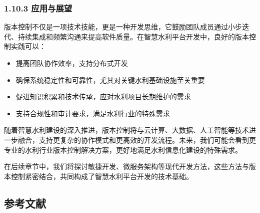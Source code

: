 \subsubsection{1.10.3 应用与展望}\label{ux5e94ux7528ux4e0eux5c55ux671b}

版本控制不仅是一项技术技能，更是一种开发思维，它鼓励团队成员通过小步迭代、持续集成和频繁沟通来提高软件质量。在智慧水利平台开发中，良好的版本控制实践可以：

\begin{itemize}
\tightlist
\item
  提高团队协作效率，支持分布式开发
\item
  确保系统稳定性和可靠性，尤其对关键水利基础设施至关重要
\item
  促进知识积累和技术传承，应对水利项目长期维护的需求
\item
  支持合规性和审计要求，满足水利行业的特殊需求
\end{itemize}

随着智慧水利建设的深入推进，版本控制将与云计算、大数据、人工智能等技术进一步融合，支持更复杂的协作模式和更高效的开发流程。未来，我们可能会看到更专业的水利行业版本控制解决方案，更好地满足水利信息化建设的特殊需求。

在后续章节中，我们将探讨敏捷开发、微服务架构等现代开发方法，这些方法与版本控制紧密结合，共同构成了智慧水利平台开发的技术基础。

\subsection{参考文献}\label{ux53c2ux8003ux6587ux732e}

